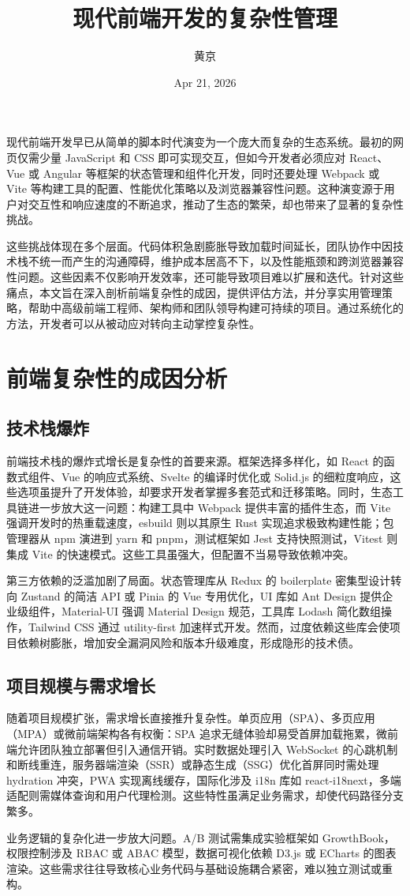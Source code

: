 \title{现代前端开发的复杂性管理}
\author{黄京}
\date{Apr 21, 2026}
\maketitle
现代前端开发早已从简单的脚本时代演变为一个庞大而复杂的生态系统。最初的网页仅需少量 JavaScript 和 CSS 即可实现交互，但如今开发者必须应对 React、Vue 或 Angular 等框架的状态管理和组件化开发，同时还要处理 Webpack 或 Vite 等构建工具的配置、性能优化策略以及浏览器兼容性问题。这种演变源于用户对交互性和响应速度的不断追求，推动了生态的繁荣，却也带来了显著的复杂性挑战。\par
这些挑战体现在多个层面。代码体积急剧膨胀导致加载时间延长，团队协作中因技术栈不统一而产生的沟通障碍，维护成本居高不下，以及性能瓶颈和跨浏览器兼容性问题。这些因素不仅影响开发效率，还可能导致项目难以扩展和迭代。针对这些痛点，本文旨在深入剖析前端复杂性的成因，提供评估方法，并分享实用管理策略，帮助中高级前端工程师、架构师和团队领导构建可持续的项目。通过系统化的方法，开发者可以从被动应对转向主动掌控复杂性。\par
\chapter{前端复杂性的成因分析}
\section{技术栈爆炸}
前端技术栈的爆炸式增长是复杂性的首要来源。框架选择多样化，如 React 的函数式组件、Vue 的响应式系统、Svelte 的编译时优化或 Solid.js 的细粒度响应，这些选项虽提升了开发体验，却要求开发者掌握多套范式和迁移策略。同时，生态工具链进一步放大这一问题：构建工具中 Webpack 提供丰富的插件生态，而 Vite 强调开发时的热重载速度，esbuild 则以其原生 Rust 实现追求极致构建性能；包管理器从 npm 演进到 yarn 和 pnpm，测试框架如 Jest 支持快照测试，Vitest 则集成 Vite 的快速模式。这些工具虽强大，但配置不当易导致依赖冲突。\par
第三方依赖的泛滥加剧了局面。状态管理库从 Redux 的 boilerplate 密集型设计转向 Zustand 的简洁 API 或 Pinia 的 Vue 专用优化，UI 库如 Ant Design 提供企业级组件，Material-UI 强调 Material Design 规范，工具库 Lodash 简化数组操作，Tailwind CSS 通过 utility-first 加速样式开发。然而，过度依赖这些库会使项目依赖树膨胀，增加安全漏洞风险和版本升级难度，形成隐形的技术债。\par
\section{项目规模与需求增长}
随着项目规模扩张，需求增长直接推升复杂性。单页应用（SPA）、多页应用（MPA）或微前端架构各有权衡：SPA 追求无缝体验却易受首屏加载拖累，微前端允许团队独立部署但引入通信开销。实时数据处理引入 WebSocket 的心跳机制和断线重连，服务器端渲染（SSR）或静态生成（SSG）优化首屏同时需处理 hydration 冲突，PWA 实现离线缓存，国际化涉及 i18n 库如 react-i18next，多端适配则需媒体查询和用户代理检测。这些特性虽满足业务需求，却使代码路径分支繁多。\par
业务逻辑的复杂化进一步放大问题。A/B 测试需集成实验框架如 GrowthBook，权限控制涉及 RBAC 或 ABAC 模型，数据可视化依赖 D3.js 或 ECharts 的图表渲染。这些需求往往导致核心业务代码与基础设施耦合紧密，难以独立测试或重构。\par

